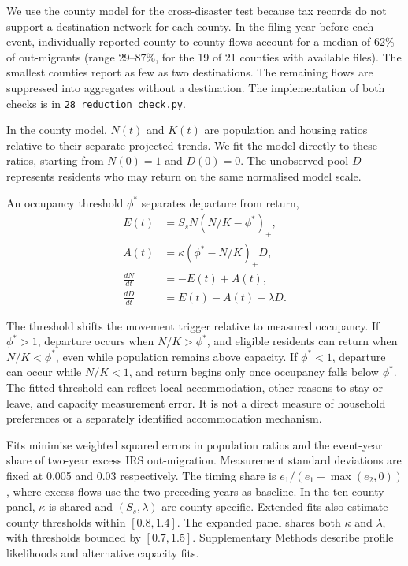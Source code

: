 \documentclass[11pt]{article}
\begin{document}
We use the county model for the cross-disaster test because tax records do not support a destination network for each county. In the filing year before each event, individually reported county-to-county flows account for a median of 62\% of out-migrants (range 29--87\%, for the 19 of 21 counties with available files). The smallest counties report as few as two destinations. The remaining flows are suppressed into aggregates without a destination. The implementation of both checks is in \texttt{28\_reduction\_check.py}.

In the county model, $N(t)$ and $K(t)$ are population and housing ratios relative to their separate projected trends. We fit the model directly to these ratios, starting from $N(0)=1$ and $D(0)=0$. The unobserved pool $D$ represents residents who may return on the same normalised model scale.

An occupancy threshold $\phi^*$ separates departure from return,
\begin{equation}
\begin{aligned}
E(t)&=S_sN\left(N/K-\phi^*\right)_+, \\
A(t)&=\kappa\left(\phi^*-N/K\right)_+D, \\
\frac{dN}{dt}&=-E(t)+A(t), \\
\frac{dD}{dt}&=E(t)-A(t)-\lambda D.
\end{aligned}
\label{eq:county}\end{equation}

The threshold shifts the movement trigger relative to measured occupancy. If $\phi^*>1$, departure occurs when $N/K>\phi^*$, and eligible residents can return when $N/K<\phi^*$, even while population remains above capacity. If $\phi^*<1$, departure can occur while $N/K<1$, and return begins only once occupancy falls below $\phi^*$. The fitted threshold can reflect local accommodation, other reasons to stay or leave, and capacity measurement error. It is not a direct measure of household preferences or a separately identified accommodation mechanism.

Fits minimise weighted squared errors in population ratios and the event-year share of two-year excess IRS out-migration. Measurement standard deviations are fixed at 0.005 and 0.03 respectively. The timing share is $e_1/(e_1+\max(e_2,0))$, where excess flows use the two preceding years as baseline. In the ten-county panel, $\kappa$ is shared and $(S_s,\lambda)$ are county-specific. Extended fits also estimate county thresholds within $[0.8,1.4]$. The expanded panel shares both $\kappa$ and $\lambda$, with thresholds bounded by $[0.7,1.5]$. Supplementary Methods describe profile likelihoods and alternative capacity fits.
\end{document}
